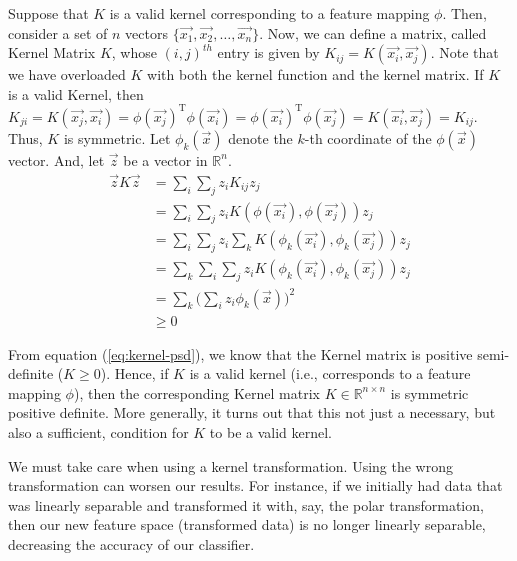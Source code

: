 Suppose that $K$ is a valid kernel corresponding to a feature mapping $\phi$. Then, consider a set of $n$ vectors $\{\vec{x_1}, \vec{x_2}, \dots, \vec{x_n}\}$. Now, we can define a matrix, called Kernel Matrix $K$, whose $(i,j)^{th}$ entry is given by $K_{ij} = K(\vec{x_i}, \vec{x_j})$. Note that we have overloaded $K$ with both the kernel function and the kernel matrix.
If $K$ is a valid Kernel, then $K_{ji} = K(\vec{x_j}, \vec{x_i}) = \phi(\vec{x_j})^{\text{T}}\phi(\vec{x_i}) = \phi(\vec{x_i})^{\text{T}}\phi(\vec{x_j}) = K(\vec{x_i}, \vec{x_j}) = K_{ij}$. Thus, $K$ is symmetric. Let $\phi_k(\vec{x})$ denote the $k$-th coordinate of the $\phi(\vec{x})$ vector. And, let $\vec{z}$ be a vector in $\mathbb{R}^n$.
\begin{align}
	\vec{z}K\vec{z} &= \sum_{i}\sum_{j} z_{i}K_{ij}z_{j} \nonumber \\
&= \sum_{i}\sum_{j} z_{i}K(\phi(\vec{x_i}), \phi(\vec{x_j}))z_{j} \nonumber \\
&= \sum_{i}\sum_{j} z_{i}\sum_{k} K(\phi_k(\vec{x_i}), \phi_k(\vec{x_j}))z_{j} \nonumber \\
&= \sum_{k}\sum_{i}\sum_{j} z_{i}K(\phi_k(\vec{x_i}), \phi_k(\vec{x_j}))z_{j} \nonumber \\
&= \sum_{k} \Bigg(\sum_{i} z_i\phi_{k}(\vec{x})\Bigg)^2 \nonumber \\
&\geq 0 \label{eq:kernel-psd}
\end{align}

From equation (\ref{eq:kernel-psd}), we know that the Kernel matrix is positive semi-definite ($K \geq 0$). Hence, if $K$ is a valid kernel (i.e., corresponds to a feature mapping $\phi$), then the corresponding Kernel matrix $K \in \mathbb{R}^{n\times n}$ is symmetric positive definite. More generally, it turns out that this not just a necessary, but also a sufficient, condition for $K$ to be a valid kernel.

We must take care when using a kernel transformation. Using the wrong transformation can worsen our results. For instance, if we initially had data that was linearly separable and transformed it with, say, the polar transformation, then our new feature space (transformed data) is no longer linearly separable, decreasing the accuracy of our classifier.